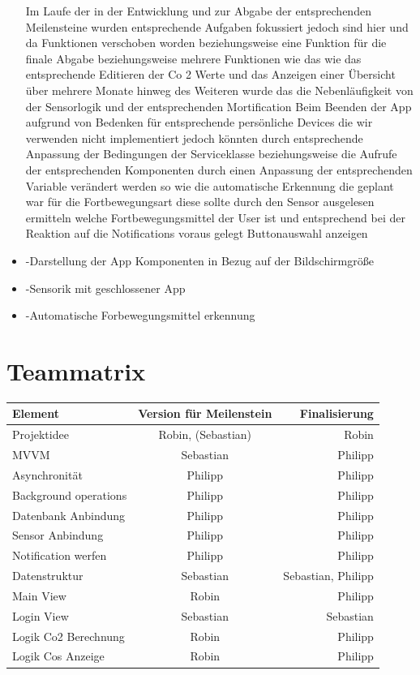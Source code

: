 \documentclass{article}
\begin{document}
\begin{itemize}
 	Im Laufe der in der Entwicklung und zur Abgabe der entsprechenden Meilensteine wurden entsprechende Aufgaben fokussiert jedoch sind hier und da Funktionen verschoben worden beziehungsweise eine Funktion für die finale Abgabe beziehungsweise mehrere Funktionen wie das wie das entsprechende Editieren der Co 2 Werte und das Anzeigen einer Übersicht über mehrere Monate hinweg des Weiteren wurde das die Nebenläufigkeit von der Sensorlogik und der entsprechenden Mortification Beim Beenden der App aufgrund von Bedenken für entsprechende persönliche Devices die wir verwenden nicht implementiert jedoch könnten durch entsprechende Anpassung der Bedingungen der Serviceklasse beziehungsweise die Aufrufe der entsprechenden Komponenten durch einen Anpassung der entsprechenden Variable verändert werden so wie die automatische Erkennung die geplant war für die Fortbewegungsart diese sollte durch den Sensor ausgelesen ermitteln welche Fortbewegungsmittel der User ist und entsprechend bei der Reaktion auf die Notifications voraus gelegt Buttonauswahl anzeigen
	\item -Darstellung der App Komponenten in Bezug auf der Bildschirmgröße
	\item -Sensorik mit geschlossener App
	\item -Automatische Forbewegungsmittel erkennung
    
  \end{itemize}
  
  
\section{Teammatrix}

\begin{tabular}[h]{l|c|r}
Element & Version für Meilenstein & Finalisierung \\
\hline
Projektidee & Robin, (Sebastian) & Robin\\
\hline
MVVM & Sebastian & Philipp\\
\hline
Asynchronität & Philipp & Philipp\\
\hline
Background operations & Philipp & Philipp\\
\hline
Datenbank Anbindung & Philipp & Philipp\\
\hline
Sensor Anbindung & Philipp & Philipp\\
\hline
Notification werfen & Philipp & Philipp\\
\hline
Datenstruktur & Sebastian & Sebastian, Philipp\\
\hline
Main View & Robin & Philipp\\
\hline
Login View & Sebastian & Sebastian\\
\hline
Logik Co2 Berechnung & Robin & Philipp\\
\hline
Logik Cos Anzeige & Robin & Philipp\\
\end{tabular}
\end{document}
